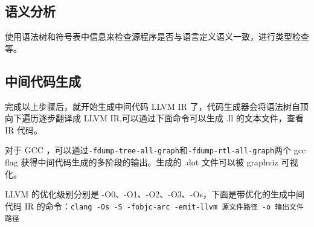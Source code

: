 \documentclass[UTF8,a4paper,10pt]{ctexart}
\begin{document}
\subsection{语义分析}
使用语法树和符号表中信息来检查源程序是否与语言定义语义一致，进行类型检查等。

\subsection{中间代码生成}
完成以上步骤后，就开始生成中间代码 LLVM IR 了，代码生成器会将语法树自顶向下遍历逐步翻译成 LLVM IR,可以通过下面命令可以生成 .ll 的文本文件，查看 IR 代码。

对于 GCC ，可以通过\verb|-fdump-tree-all-graph|和\verb|-fdump-rtl-all-graph|两个 gcc flag 获得中间代码生成的多阶段的输出。生成的 .dot 文件可以被 graphviz 可视化。

LLVM 的优化级别分别是 -O0、-O1、-O2、-O3、-Os，下面是带优化的生成中间代码 IR 的命令：\verb|clang -Os -S -fobjc-arc -emit-llvm 源文件路径 -o 输出文件路径|
\end{document}
